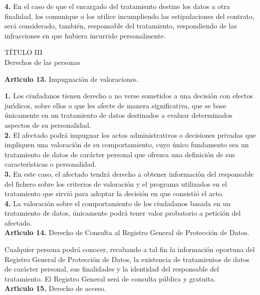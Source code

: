 {\bf 4.} En el caso de que el encargado del tratamiento destine los datos a 
otra finalidad, los comunique o los utilice incumpliendo las estipulaciones del 
contrato, ser\'a considerado, tambi\'en, responsable del tratamiento, 
respondiendo de las infracciones en que hubiera incurrido personalmente.\\
\begin{center}
{\LARGE T\'ITULO III}\\
{\large Derechos de las personas}
\end{center}
\vspace{0.3cm}
{\large {\bf Art\'{\i}culo 13.} Impugnaci\'on de valoraciones.}

{\bf 1.} Los ciudadanos tienen derecho a no verse sometidos a una decisi\'on 
con efectos jur\'{\i}dicos, sobre ellos o que les afecte de manera 
significativa, que se base \'unicamente en un tratamiento de datos destinados a 
evaluar determinados aspectos de su personalidad.\\

{\bf 2.} El afectado podr\'a impugnar los actos administrativos o decisiones 
privadas que impliquen una valoraci\'on de su comportamiento, cuyo \'unico 
fundamento sea un tratamiento de datos de car\'acter personal que ofrezca una 
definici\'on de sus caracter\'{\i}sticas o personalidad.\\

{\bf 3.} En este caso, el afectado tendr\'a derecho a obtener informaci\'on del 
responsable del fichero sobre los criterios de valoraci\'on y el programa 
utilizados en el tratamiento que sirvi\'o para adoptar la decisi\'on en que 
consisti\'o el acto.\\

{\bf 4.} La valoraci\'on sobre el comportamiento de los ciudadanos basada en un 
tratamiento de datos, \'unicamente podr\'a tener valor probatorio a petici\'on 
del afectado.
\vspace{0.3cm}\\
{\large {\bf Art\'{\i}culo 14.} Derecho de Consulta al Registro General de 
Protecci\'on de Datos.}

Cualquier persona podr\'a conocer, recabando a tal fin la informaci\'on 
oportuna del Registro General de Protecci\'on de Datos, la existencia de 
tratamientos de datos de car\'acter personal, sus finalidades y la identidad 
del responsable del tratamiento. El Registro General ser\'a de consulta 
p\'ublica y gratuita.
\vspace{0.3cm}\\
{\large {\bf Art\'{\i}culo 15.} Derecho de acceso.}

